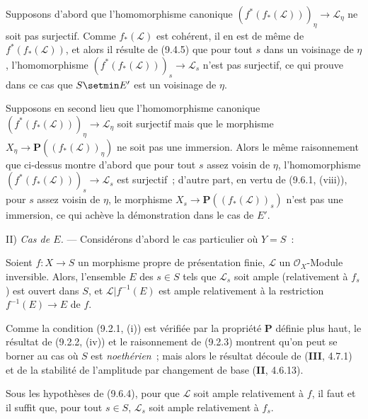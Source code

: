 Supposons d'abord que l'homomorphisme canonique
$(f^*(f_*(\mathcal L)))_\eta\to\mathcal L_\eta$ ne soit pas surjectif. Comme
$f_*(\mathcal L)$ est cohérent, il en est de même de $f^*(f_*(\mathcal L))$,
et alors il résulte de (9.4.5) que pour tout $s$ dans un voisinage de $\eta$,
l'homomorphisme $(f^*(f_*(\mathcal L)))_s\to\mathcal L_s$ n'est pas
surjectif, ce qui prouve dans ce cas que $S\setmin E'$ est un voisinage de $\eta$.

Supposons en second lieu que l'homomorphisme canonique
$(f^*(f_*(\mathcal L)))_\eta\to\mathcal L_\eta$ soit surjectif mais que le
morphisme $X_\eta\to\mathbf P((f_*(\mathcal L))_\eta)$ ne soit pas une
immersion. Alors le même raisonnement que ci-dessus montre d'abord que pour
tout $s$ assez voisin de $\eta$, l'homomorphisme
$(f^*(f_*(\mathcal L)))_s\to\mathcal L_s$ est surjectif~; d'autre part, en
vertu de (9.6.1, (viii)), pour $s$ assez voisin de $\eta$, le morphisme
$X_s\to\mathbf P((f_*(\mathcal L))_s)$ n'est pas une immersion, ce qui achève
la démonstration dans le cas de $E'$.

II) \emph{Cas de $E$.} --- Considérons d'abord le cas particulier où $Y=S$~:

\begin{corollary}[9.6.4]
\label{IV.9.6.4-fr}
Soient $f:X\to S$ un morphisme \textup{propre} de présentation finie, $\mathcal L$ un
$\mathcal O_X$-Module inversible. Alors, l'ensemble $E$ des $s\in S$ tels que
$\mathcal L_s$ soit ample (relativement à $f_s$) est ouvert dans $S$, et
$\mathcal L|f^{-1}(E)$ est ample relativement à la restriction
$f^{-1}(E)\to E$ de $f$.
\end{corollary}

Comme la condition (9.2.1, (i)) est vérifiée par la propriété $\boldsymbol{P}$ définie plus
haut, le résultat de (9.2.2, (iv)) et le raisonnement de (9.2.3) montrent qu'on
peut se borner au cas où $S$ est \emph{noethérien}~; mais alors le résultat
découle de (\textbf{III}, 4.7.1) et de la stabilité de l'amplitude par
changement de base (\textbf{II}, 4.6.13).

\begin{corollary}[9.6.5]
\label{IV.9.6.5-fr}
Sous les hypothèses de (9.6.4), pour que $\mathcal L$ soit ample relativement
à $f$, il faut et il suffit que, pour tout $s\in S$, $\mathcal L_s$ soit ample
relativement à $f_s$.
\end{corollary}

